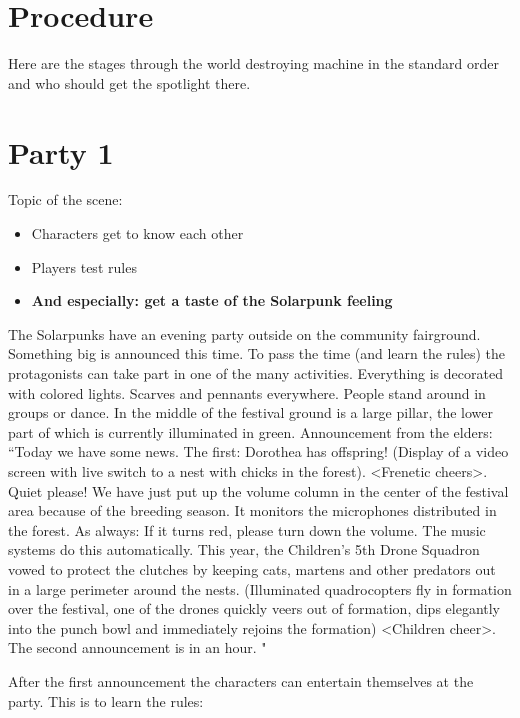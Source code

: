 \section{Procedure}
Here are the stages through the world destroying machine in the standard order and who should get the spotlight there.



\section{Party 1}

Topic of the scene: 
\begin{itemize}
\item Characters get to know each other
\item Players test rules
\item \bf{And especially: get a taste of the Solarpunk feeling}
\end{itemize}

The Solarpunks have an evening party outside on the community fairground. Something big is announced this time. To pass the time (and learn the rules) the protagonists can take part in one of the many activities. 
Everything is decorated with colored lights. Scarves and pennants everywhere. People stand around in groups or dance. In the middle of the festival ground is a large pillar, the lower part of which is currently illuminated in green.
Announcement from the elders: “Today we have some news. The first: Dorothea has offspring! (Display of a video screen with live switch to a nest with chicks in the forest). <Frenetic cheers>. Quiet please! We have just put up the volume column in the center of the festival area because of the breeding season.
It monitors the microphones distributed in the forest.
As always: If it turns red, please turn down the volume. The music systems do this automatically. This year, the Children's 5th Drone Squadron vowed to protect the clutches by keeping cats, martens and other predators out in a large perimeter around the nests. (Illuminated quadrocopters fly in formation over the festival, one of the drones quickly veers out of formation, dips elegantly into the punch bowl and immediately rejoins the formation) <Children cheer>.
The second announcement is in an hour.
"

After the first announcement the characters can entertain themselves at the party. This is to learn the rules:

